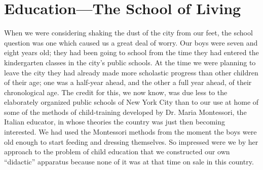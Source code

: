 \documentclass{book}
\begin{document}
\chapter{Education—The School of Living}
\label{chapter-7}
When we were considering shaking the dust of the city from our feet, the school question was one which caused us a great deal of worry. Our boys were seven and eight years old; they had been going to school from the time they had entered the kindergarten classes in the city’s public schools. At the time we were planning to leave the city they had already made more scholastic progress than other children of their age; one was a half-year ahead, and the other a full year ahead, of their chronological age. The credit for this, we now know, was due less to the elaborately organized public schools of New York City than to our use at home of some of the methods of child-training developed by Dr. Maria Montessori, the Italian educator, in whose theories the country was just then becoming interested. We had used the Montessori methods from the moment the boys were old enough to start feeding and dressing themselves. So impressed were we by her approach to the problem of child education that we constructed our own “didactic” apparatus because none of it was at that time on sale in this country.
\end{document}
